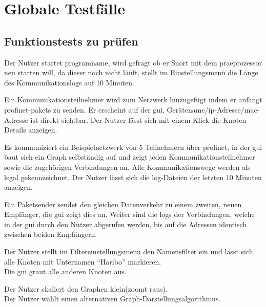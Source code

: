 \chapter{Globale Testfälle}

\section{Funktionstests zu prüfen}

\begin{description}[style=multiline, leftmargin=4cm, labelwidth=4cm]
  \item[\namedlabel{start}{Programm starten}] Der Nutzer startet \gls{programname}, wird gefragt ob er Snort mit dem \gls{praeprozessor} neu starten will, da dieser noch nicht läuft, stellt im Einstellungsmenü die Länge des Kommunikationslogs auf 10 Minuten.
  \item[\namedlabel{addNetNode}{Kommunikationsteilnehmer hinzufügen}] Ein Kommunikationsteilnehmer wird zum Netzwerk hinzugefügt indem er anfängt \gls{profinet}-\glspl{paket} zu senden. Er erscheint auf der \gls{gui}, Gerätename/\gls{ip}-Adresse/\gls{mac}-Adresse ist direkt sichtbar. Der Nutzer lässt sich mit einem Klick die Knoten-Details anzeigen.
  \item[\namedlabel{normalWatch}{Normale Netzwerküberwachung}] Es kommuniziert ein Beispielnetzwerk von 5 Teilnehmern über \gls{profinet}, in der \gls{gui} baut sich ein Graph selbständig auf und zeigt jeden Kommunikationsteilnehmer sowie die zugehörigen Verbindungen an. Alle Kommunikationswege werden als legal gekennzeichnet. Der Nutzer lässt sich die \gls{log}-Dateien der letzten 10 Minuten anzeigen.
  \item[\namedlabel{guiDisplay}{Korrekte GUI Darstellung}] Ein Paketsender sendet den gleichen Datenverkehr zu einem zweiten, neuen Empfänger, die \gls{gui} zeigt dies an. Weiter sind die \glspl{log} der Verbindungen, welche in der \gls{gui} durch den Nutzer abgerufen werden, bis auf die Adressen identisch zwischen beiden Empfängern.
  \item[\namedlabel{filter}{Filter anwenden}] Der Nutzer stellt im Filtereinstellungsmenü den Namensfilter ein und lässt sich alle Knoten mit Unternamen “Haribo” markieren. \\Die \gls{gui} graut alle anderen Knoten aus.
  \item[\namedlabel{guiChanging}{Graph verändern}] Der Nutzer skaliert den Graphen klein(zoomt raus). \\Der Nutzer wählt einen alternativen Graph-Darstellungsalgorithmus.

\end{description}
